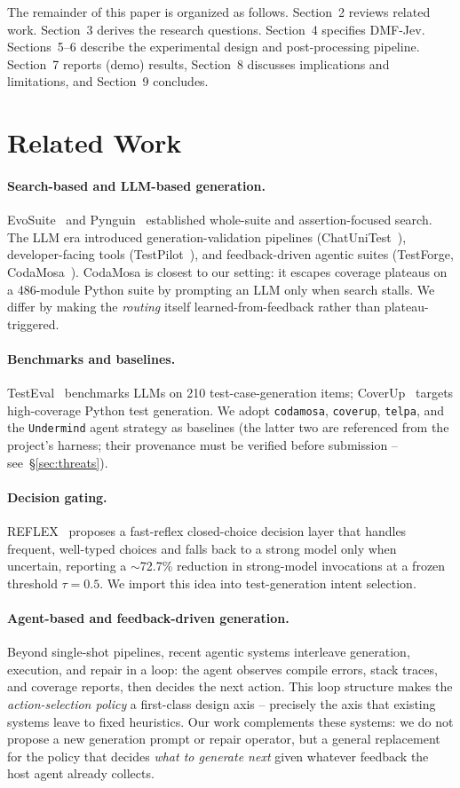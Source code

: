 \documentclass[11pt]{article}
\begin{document}
The remainder of this paper is organized as follows. Section~2 reviews related work. Section~3 derives the research questions. Section~4 specifies DMF-Jev. Sections~5--6 describe the experimental design and post-processing pipeline. Section~7 reports (demo) results, Section~8 discusses implications and limitations, and Section~9 concludes.

\section{Related Work}
\paragraph{Search-based and LLM-based generation.}
EvoSuite~\cite{evosuite} and Pynguin~\cite{pynguin} established whole-suite and assertion-focused search. The LLM era introduced generation-validation pipelines (ChatUniTest~\cite{chatunitest}), developer-facing tools (TestPilot~\cite{testpilot}), and feedback-driven agentic suites (TestForge, CodaMosa~\cite{codamosa}). CodaMosa is closest to our setting: it escapes coverage plateaus on a 486-module Python suite by prompting an LLM only when search stalls. We differ by making the \emph{routing} itself learned-from-feedback rather than plateau-triggered.
\paragraph{Benchmarks and baselines.}
TestEval~\cite{testeval} benchmarks LLMs on 210 test-case-generation items; CoverUp~\cite{coverup} targets high-coverage Python test generation. We adopt \texttt{codamosa}, \texttt{coverup}, \texttt{telpa}, and the \texttt{Undermind} agent strategy as baselines (the latter two are referenced from the project's harness; their provenance must be verified before submission -- see~\S\ref{sec:threats}).
\paragraph{Decision gating.}
REFLEX~\cite{reflex} proposes a fast-reflex closed-choice decision layer that handles frequent, well-typed choices and falls back to a strong model only when uncertain, reporting a $\sim$72.7\% reduction in strong-model invocations at a frozen threshold $\tau=0.5$. We import this idea into test-generation intent selection.

\paragraph{Agent-based and feedback-driven generation.}
Beyond single-shot pipelines, recent agentic systems interleave generation, execution, and repair in a loop: the agent observes compile errors, stack traces, and coverage reports, then decides the next action. This loop structure makes the \emph{action-selection policy} a first-class design axis -- precisely the axis that existing systems leave to fixed heuristics. Our work complements these systems: we do not propose a new generation prompt or repair operator, but a general replacement for the policy that decides \emph{what to generate next} given whatever feedback the host agent already collects.
\end{document}
